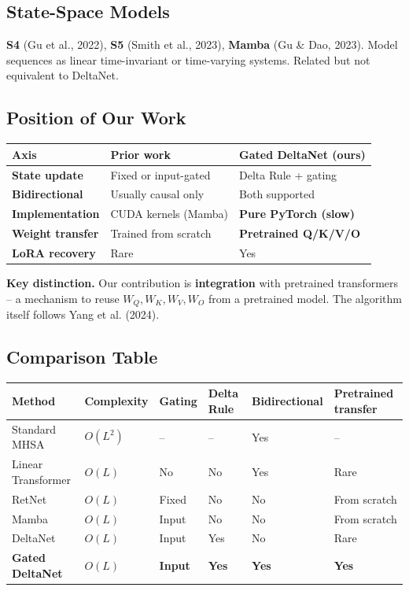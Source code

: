 \subsection{State-Space Models}

\textbf{S4} (Gu et al., 2022), \textbf{S5} (Smith et al., 2023), \textbf{Mamba} (Gu \& Dao, 
2023). Model sequences as linear time-invariant or time-varying systems. 
Related but not equivalent to DeltaNet.

\subsection{Position of Our Work}

\begin{table}[H]
\centering
\small
\begin{tabular}{lll}
\toprule
\textbf{Axis} & \textbf{Prior work} & \textbf{Gated DeltaNet (ours)} \\
\midrule
\textbf{State update} & Fixed or input-gated & Delta Rule + gating \\
\textbf{Bidirectional} & Usually causal only & Both supported \\
\textbf{Implementation} & CUDA kernels (Mamba) & \textbf{Pure PyTorch (slow)} \\
\textbf{Weight transfer} & Trained from scratch & \textbf{Pretrained Q/K/V/O} \\
\textbf{LoRA recovery} & Rare & Yes \\
\bottomrule
\end{tabular}
\end{table}

\textbf{Key distinction.} Our contribution is \textbf{integration} with pretrained 
transformers -- a mechanism to reuse $W_Q, W_K, W_V, W_O$ from a pretrained 
model. The algorithm itself follows Yang et al. (2024).



\subsection{Comparison Table}

\begin{table}[H]
\centering
\small
\begin{tabular}{llllll}
\toprule
\textbf{Method} & \textbf{Complexity} & \textbf{Gating} & \textbf{Delta Rule} & \textbf{Bidirectional} & \textbf{Pretrained transfer} \\
\midrule
Standard MHSA & $O(L^2)$ & -- & -- & Yes & -- \\
Linear Transformer & $O(L)$ & No & No & Yes & Rare \\
RetNet & $O(L)$ & Fixed & No & No & From scratch \\
Mamba & $O(L)$ & Input & No & No & From scratch \\
DeltaNet & $O(L)$ & Input & Yes & No & Rare \\
\textbf{Gated DeltaNet} & \textbf{$O(L)$} & \textbf{Input} & \textbf{Yes} & \textbf{Yes} & \textbf{Yes} \\
\bottomrule
\end{tabular}
\end{table}

